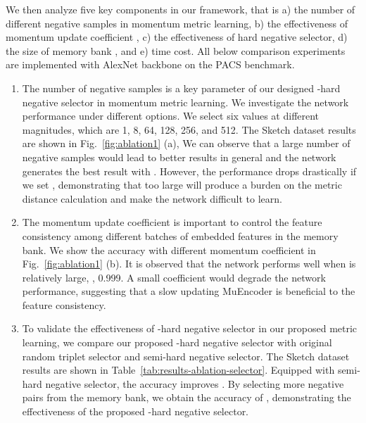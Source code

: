 We then analyze five key components in our framework, that is a) the number of different negative samples  in momentum metric learning, b) the effectiveness of momentum update coefficient , c) the effectiveness of hard negative selector, d) the size of memory bank , and e) time cost.
All below comparison experiments are implemented with AlexNet backbone on the PACS benchmark.


\renewcommand{\theenumi}{\alph{enumi}}
\begin{enumerate}
	\item The number of negative samples  is a key parameter of our designed -hard negative selector in momentum metric learning. 
	We investigate the network performance under different options.
	We select six  values at different magnitudes, which are 1, 8, 64, 128, 256, and 512.
	The Sketch dataset results are shown in Fig.~\ref{fig:ablation1} (a), 
	We can observe that a large number of negative samples would lead to better results in general and the network generates the best result with . 
However, the performance drops drastically if we set , demonstrating that too large  will produce a burden on the metric distance calculation and make the network difficult to learn.


	\item The momentum update coefficient  is important to control the feature consistency among different batches of embedded features in the memory bank. 
	We show the accuracy with different momentum coefficient  in Fig.~\ref{fig:ablation1} (b).
	It is observed that the network performs well when  is relatively large, \ie, 0.999.
A small coefficient would degrade the network performance, suggesting that a slow updating MuEncoder is beneficial to the feature consistency.


\item To validate the effectiveness of -hard negative selector in our proposed metric learning, we compare our proposed -hard negative selector with original random triplet selector and semi-hard negative selector.
The Sketch dataset results are shown in Table~\ref{tab:results-ablation-selector}.
	Equipped with semi-hard negative selector, the accuracy improves .
	By selecting more negative pairs from the memory bank, we obtain the accuracy of , demonstrating the effectiveness of the proposed -hard negative selector.
	

\end{enumerate}
